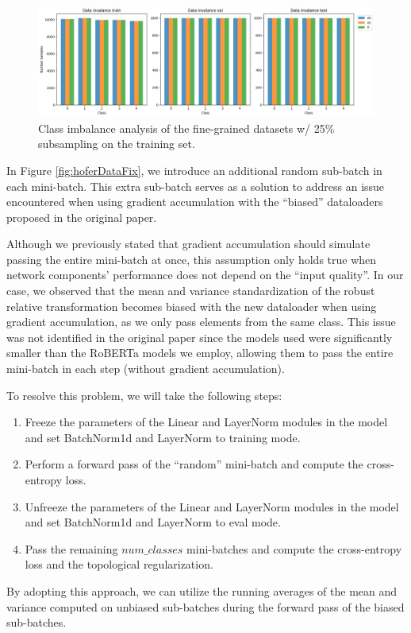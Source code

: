 \documentclass[../main.tex]{subfiles}
\begin{document}
\begin{figure}[!ht]
    \centering
    \includegraphics[width=\textwidth]{figures/mt/class_invalance.png} 
    \caption{Class imbalance analysis of the fine-grained datasets w/ 25\% subsampling on the training set.}
    \label{fig:clsImb}
\end{figure}


In Figure \ref{fig:hoferDataFix}, we introduce an additional random sub-batch in each mini-batch. This extra sub-batch serves as a solution to address an issue encountered when using gradient accumulation with the ``biased'' dataloaders proposed in the original paper. 

Although we previously stated that gradient accumulation should simulate passing the entire mini-batch at once, this assumption only holds true when network components' performance does not depend on the ``input quality''. In our case, we observed that the mean and variance standardization of the robust relative transformation becomes biased with the new dataloader when using gradient accumulation, as we only pass elements from the same class. This issue was not identified in the original paper since the models used were significantly smaller than the RoBERTa models we employ, allowing them to pass the entire mini-batch in each step (without gradient accumulation).

To resolve this problem, we will take the following steps:
\begin{enumerate}
    \item Freeze the parameters of the Linear and LayerNorm modules in the model and set BatchNorm1d and LayerNorm to training mode.
    
    \item Perform a forward pass of the ``random'' mini-batch and compute the cross-entropy loss.
    
    \item Unfreeze the parameters of the Linear and LayerNorm modules in the model and set BatchNorm1d and LayerNorm to eval mode.
    
    \item Pass the remaining $num\_classes$ mini-batches and compute the cross-entropy loss and the topological regularization.

\end{enumerate}
By adopting this approach, we can utilize the running averages of the mean and variance computed on unbiased sub-batches during the forward pass of the biased sub-batches.\\
\end{document}
